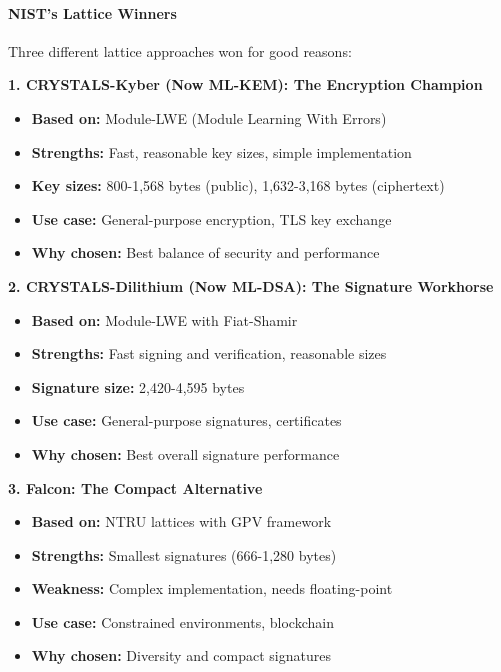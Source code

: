 \documentclass[11pt,a4paper]{article}
\begin{document}
\paragraph{NIST's Lattice Winners}

Three different lattice approaches won for good reasons:

\textbf{1. CRYSTALS-Kyber (Now ML-KEM): The Encryption Champion}
\begin{itemize}
    \item \textbf{Based on:} Module-LWE (Module Learning With Errors)
    \item \textbf{Strengths:} Fast, reasonable key sizes, simple implementation
    \item \textbf{Key sizes:} 800-1,568 bytes (public), 1,632-3,168 bytes (ciphertext)
    \item \textbf{Use case:} General-purpose encryption, TLS key exchange
    \item \textbf{Why chosen:} Best balance of security and performance
\end{itemize}

\textbf{2. CRYSTALS-Dilithium (Now ML-DSA): The Signature Workhorse}
\begin{itemize}
    \item \textbf{Based on:} Module-LWE with Fiat-Shamir
    \item \textbf{Strengths:} Fast signing and verification, reasonable sizes
    \item \textbf{Signature size:} 2,420-4,595 bytes
    \item \textbf{Use case:} General-purpose signatures, certificates
    \item \textbf{Why chosen:} Best overall signature performance
\end{itemize}

\textbf{3. Falcon: The Compact Alternative}
\begin{itemize}
    \item \textbf{Based on:} NTRU lattices with GPV framework
    \item \textbf{Strengths:} Smallest signatures (666-1,280 bytes)
    \item \textbf{Weakness:} Complex implementation, needs floating-point
    \item \textbf{Use case:} Constrained environments, blockchain
    \item \textbf{Why chosen:} Diversity and compact signatures
\end{itemize}
\end{document}
